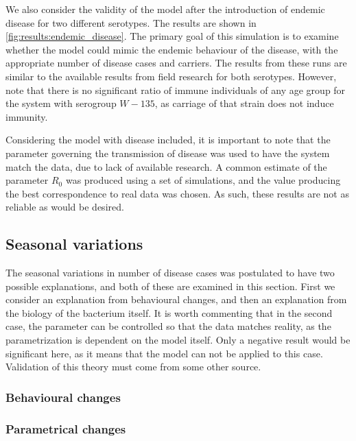 \documentclass[10pt,a4paper]{article}
\begin{document}
We also consider the validity of the model after the introduction of endemic disease for two different serotypes. The results are shown in \cref{fig:results:endemic_disease}. The primary goal of this simulation is to examine whether the model could mimic the endemic behaviour of the disease, with the appropriate number of disease cases and carriers. The results from these runs are similar to the available results from field research for both serotypes. However, note that there is no significant ratio of immune individuals of any age group for the system with serogroup $W-135$, as carriage of that strain does not induce immunity.

Considering the model with disease included, it is important to note that the parameter governing the transmission of disease was used to have the system match the data, due to lack of available research. A common estimate of the parameter $R_0$ was produced using a set of simulations, and the value producing the best correspondence to real data was chosen. As such, these results are not as reliable as would be desired.


\subsection{Seasonal variations}

The seasonal variations in number of disease cases was postulated to have two possible explanations, and both of these are examined in this section. First we consider an explanation from behavioural changes, and then an explanation from the biology of the bacterium itself. It is worth commenting that in the second case, the parameter can be controlled so that the data matches reality, as the parametrization is dependent on the model itself. Only a negative result would be significant here, as it means that the model can not be applied to this case. Validation of this theory must come from some other source.

\subsubsection{Behavioural changes}



\subsubsection{Parametrical changes}
\end{document}
